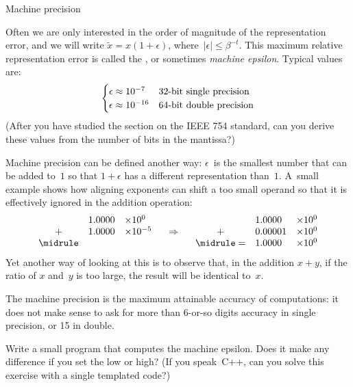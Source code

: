  {Machine precision}
\label{sec:machine-eps}

Often we are only interested in the order of magnitude of the
representation error,
and we will write $\tilde x=x(1+\epsilon)$, where~$|\epsilon|\leq\beta^{-t}$.
This maximum relative representation error is called the
,
or sometimes
\emph{machine epsilon}.
Typical values are:
\begin{equation} 
\begin{cases}
  \epsilon\approx10^{-7}&\hbox{32-bit single precision}\\
  \epsilon\approx10^{-16}&\hbox{64-bit double precision}
\end{cases}
\end{equation}
(After you have studied the section on the IEEE 754 standard,
can you derive these values from the number of bits in the mantissa?)

Machine precision can be defined another way: $\epsilon$~is the
smallest number that can be added to~$1$ so that $1+\epsilon$ has a
different representation than~$1$. A~small example shows how aligning
exponents can shift a too small operand so that it is effectively ignored in
the addition operation:
\begin{equation}
\begin{array}{cll}
   &1.0000&\times 10^0\\
  +&1.0000&\times 10^{-5}\\ \midrule
\end{array}
\quad\Rightarrow\quad
\begin{array}{cll}
   &1.0000&\times 10^0\\
  +&0.00001&\times 10^0\\ \midrule
  =&1.0000&\times 10^0
\end{array}
\end{equation}
Yet another way of looking at this
is to observe that, in the addition $x+y$, if the ratio of $x$ and~$y$
is too large, the result will be identical to~$x$.

The machine precision is the maximum attainable accuracy of
computations: it does not make sense to ask for more than 6-or-so
digits accuracy in single precision, or 15 in double.

\begin{nopackt}
\begin{exercise}
  \label{ex:epsilon}%
  Write a small program that computes the machine epsilon. Does it
  make any difference if you set the
   low or high? 
  (If you speak~C++, can you solve this exercise with a single
  templated code?)
\end{exercise}
\end{nopackt}

